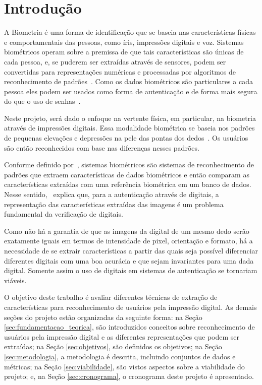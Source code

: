 \section{Introdução}\label{sec:introduacao}

A Biometria é uma forma de identificação que se baseia nas características físicas e comportamentais das pessoas, como íris, impressões digitais e voz. Sistemas biométricos operam sobre a premissa de que tais características são únicas de cada pessoa, e, se puderem ser extraídas através de sensores, podem ser convertidas para representações numéricas e processadas por algoritmos de reconhecimento de padrões~\cite{HandbookOfBiometrics}. Como os dados biométricos são particulares a cada pessoa eles podem ser usados como forma de autenticação e de forma mais segura do que o uso de senhas~\cite{biometrics_a_tool_for_information_security}. 

Neste projeto, será dado o enfoque na vertente física, em particular, na biometria através de impressões digitais. Essa modalidade biométrica se baseia nos padrões de pequenas elevações e depressões na pele das pontas dos dedos~\cite{HandbookOfBiometrics}. Os usuários são então reconhecidos com base nas diferenças nesses padrões.

Conforme definido por~, sistemas biométricos são sistemas de reconhecimento de padrões que extraem características de dados biométricos e então comparam as características extraídas com uma referência biométrica em um banco de dados. Nesse sentido,~ explica que, para a autenticação através de digitais, a representação das características extraídas das imagens é um problema fundamental da verificação de digitais. 

Como não há a garantia de que as imagens da digital de um mesmo dedo serão exatamente iguais em termos de intensidade de pixel, orientação e formato, há a necessidade de se extrair características a partir das quais seja possível diferenciar diferentes digitais com uma boa acurácia e que sejam invariantes para uma dada digital. Somente assim o uso de digitais em sistemas de autenticação se tornariam viáveis.

O objetivo deste trabalho é avaliar diferentes técnicas de extração de características para reconhecimento de usuários pela impressão digital. As demais seções do projeto estão organizadas da seguinte forma: na Seção \ref{sec:fundamentacao_teorica}, são introduzidos conceitos sobre reconhecimento de usuários pela impressão digital e as diferentes representações que podem ser extraídas; na Seção \ref{sec:objetivos}, são definidos os objetivos; na Seção \ref{sec:metodologia}, a metodologia é descrita, incluindo conjuntos de dados e métricas; na Seção \ref{sec:viabilidade}, são vistos aspectos sobre a viabilidade do projeto; e, na Seção \ref{sec:cronograma}, o cronograma deste projeto é apresentado.
